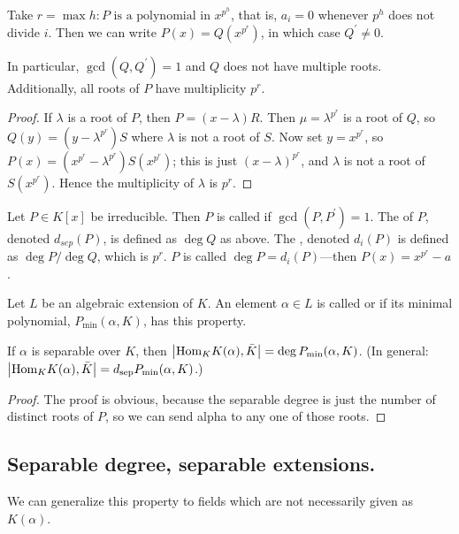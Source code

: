 Take $r = \max{h : \text{$P$ is a polynomial in $x^{p^h}$}}$, that is, $a_i = 0$ whenever $p^h$ does not divide $i$.
Then we can write $P(x) = Q(x^{p^r})$, in which case $Q^\prime \neq 0$.
\begin{prop}
In particular, $\gcd(Q, Q^\prime) = 1$ and $Q$ does not have multiple roots.
Additionally, all roots of $P$ have multiplicity $p^r$.
\end{prop}
\begin{proof}
If $\lambda$ is a root of $P$, then $P = (x - \lambda) R$.
Then $\mu = \lambda^{p^r}$ is a root of $Q$, so $Q(y) = (y - \lambda^{p^r}) S$ where $\lambda$ is not a root of $S$.
Now set $y = x^{p^r}$, so $P(x) = (x^{p^r} - \lambda^{p^r}) S(x^{p^r})$; this is just $(x - \lambda)^{p^r}$, and $\lambda$ is not a root of $S(x^{p^r})$.
Hence the multiplicity of $\lambda$ is $p^r$.
\end{proof}
\begin{dfn}
Let $P \in K[x]$ be irreducible. Then $P$ is called  if $\gcd(P, P^\prime) = 1$. 
The  of $P$, denoted $d_{sep}(P)$, is defined as $\deg Q$ as above.
The , denoted $d_i(P)$ is defined as $\deg P / \deg Q$, which is $p^r$.
$P$ is called  $\deg P = d_i(P)$---then $P(x) = x^{p^r} - a$.
\end{dfn}
\begin{dfn}
Let $L$ be an algebraic extension of $K$. An element $\alpha \in L$ is called  or  if its minimal polynomial, $P_{\min}(\alpha, K)$, has this property.
\end{dfn}
\begin{prop}
If $\alpha$ is separable over $K$, then $\left|\mathrm{Hom}_{K}{K(\alpha), \bar{K}}\right| = \deg P_{\min}(\alpha, K)$.
(In general: $\left|\mathrm{Hom}_{K}{K(\alpha), \bar{K}}\right| = d_{\mathrm{sep}} P_{\min}(\alpha, K)$.)
\end{prop}
\begin{proof}
The proof is obvious, because the separable degree is just the number of distinct roots of $P$, so we can send alpha to any one of those roots.
\end{proof}

\subsection{Separable degree, separable extensions.}
We can generalize this property to fields which are not necessarily given as $K(\alpha)$.

